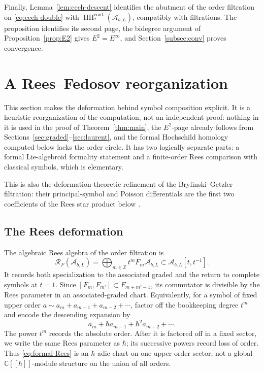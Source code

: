 \documentclass[11pt,oneside,reqno]{article}
\DeclareMathOperator{\HH}{HH}
\newcommand{\cA}{\mathcal A}
\theoremstyle{plain}
\theoremstyle{definition}
\theoremstyle{remark}
\begin{document}
Finally, Lemma~\ref{lem:cech-descent} identifies the abutment of the order
filtration on \eqref{eq:cech-double} with
\(\HH_*^{\mathrm{cont}}(\cA_{b,L})\), compatibly with filtrations. The proposition identifies its second
page, the bidegree argument of Proposition~\ref{prop:E2} gives
\(E^2=E^\infty\), and Section~\ref{subsec:conv} proves convergence.

\section{A Rees--Fedosov reorganization}\label{sec:rees}

This section makes the deformation behind symbol composition explicit. It
is a heuristic reorganization of the computation, not an independent
proof: nothing in it is used in the proof of Theorem~\ref{thm:main}, the
\(E^2\)-page already follows from
Sections~\ref{sec:graded}--\ref{sec:laurent}, and the formal Hochschild
homology computed below lacks the order circle. It has two logically
separate parts: a formal Lie-algebroid formality statement and a
finite-order Rees comparison with classical symbols, which is elementary.

This is also the deformation-theoretic refinement of the
Brylinski--Getzler filtration: their principal-symbol and Poisson
differentials are the first two coefficients of the Rees star product below
\cite{BG}.

\subsection{The Rees deformation}

The algebraic Rees algebra of the order filtration is
\[
 \mathcal R_F(\cA_{b,L})
 =\bigoplus_{m\in\mathbb Z}t^mF_m\cA_{b,L}
 \subset \cA_{b,L}[t,t^{-1}].
\]
It records both specialization to the associated graded and the return to
complete symbols at \(t=1\).  Since
\([F_m,F_{m'}]\subset F_{m+m'-1}\), its commutator is divisible by the
Rees parameter in an associated-graded chart.  Equivalently, for a symbol
of fixed upper order
\(a\sim a_m+a_{m-1}+a_{m-2}+\cdots\), factor off the bookkeeping degree
\(t^m\) and encode the descending expansion by
\begin{equation}\label{eq:formal-Rees}
 a_m+\hbar a_{m-1}+\hbar^2a_{m-2}+\cdots .
\end{equation}
The power \(t^m\) records the absolute order.  After it is factored off in a
fixed sector, we write the same Rees parameter as \(\hbar\); its successive
powers record loss of order.  Thus \eqref{eq:formal-Rees} is an
\(\hbar\)-adic chart on one upper-order sector, not a global
\(\mathbb C[[\hbar]]\)-module structure on the union of all orders.
\end{document}
